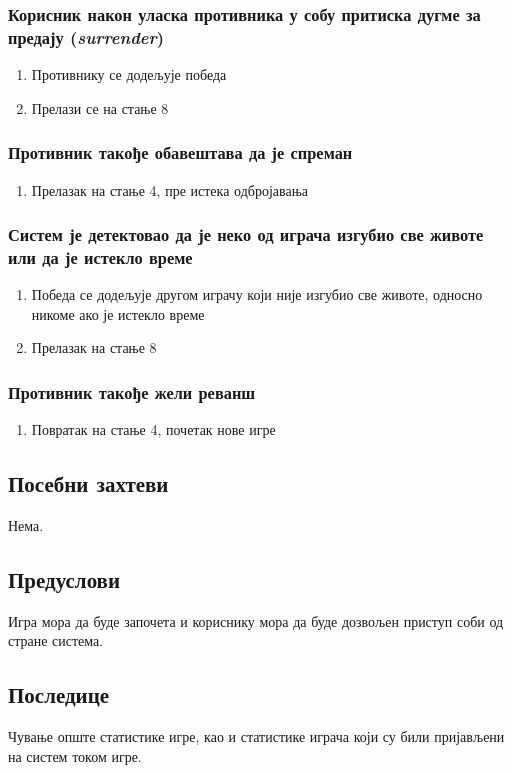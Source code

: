 \subsubsection{Корисник након уласка противника у собу притиска дугме за предају (\textit{surrender})}
\begin{enumerate}[label=2.\arabic*]
	\item Противнику се додељује победа
	\item Прелази се на стање 8
\end{enumerate}

\subsubsection{Противник такође обавештава да је спреман}
\begin{enumerate}[label=3.\arabic*]
	\item Прелазак на стање 4, пре истека одбројавања
\end{enumerate}

\subsubsection{Систем је детектовао да је неко од играча изгубио све животе или да је истекло време}
\begin{enumerate}[label=6.\arabic*]
	\item Победа се додељује другом играчу који није изгубио све животе, 
	    односно никоме ако је истекло време
	\item Прелазак на стање 8
\end{enumerate}

\subsubsection{Противник такође жели реванш}
\begin{enumerate}[label=9.\arabic*]
	\item Повратак на стање 4, почетак нове игре
\end{enumerate}

\subsection{Посебни захтеви}
Нема.

\subsection{Предуслови}
Игра мора да буде започета и кориснику мора да буде дозвољен приступ соби од стране система.

\subsection{Последице}
Чување опште статистике игре, као и статистике играча који су били пријављени на систем током игре.

